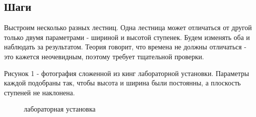 \documentclass[a4paper,12pt]{report}
\begin{document}
\subsection*{Шаги} \text{ }

Выстроим несколько разных лестниц. Одна лестница может отличаться от другой только двумя параметрами - шириной и высотой ступенек. Будем изменять оба и наблюдать за результатом. Теория говорит, что времена не должны отличаться - это кажется неочевидным, поэтому требует тщательной проверки.

Рисунок 1 - фотография сложенной из кинг лабораторной установки. Параметры каждой подобраны так, чтобы высота и ширина были постоянны, а плоскость ступеней не наклонена. 

\begin{figure}[H]
\caption{лабораторная установка}
\end{figure}

\begin{table}[H]
\centering
{}
\caption{параметры пружин}
\end{table}
\end{document}
